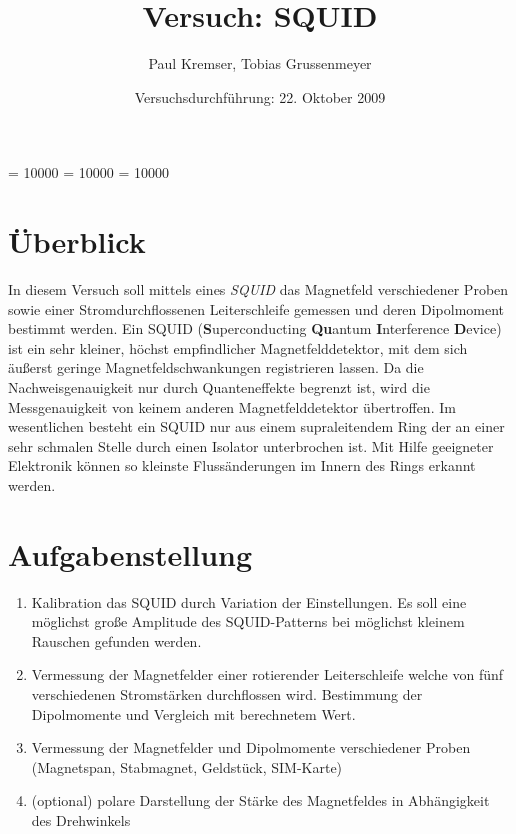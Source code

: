 \documentclass[12pt]{article}
\newcommand{\changefont}[3]{
\fontfamily{#1} \fontseries{#2} \fontshape{#3} \selectfont}
\begin{document}
\clubpenalty = 10000
\widowpenalty = 10000 
\displaywidowpenalty = 10000

\onehalfspacing
\changefont{ptm}{m}{n} 

\begin{titlepage}
\author{Paul Kremser, Tobias Grussenmeyer}
\title{Versuch: SQUID}
\date{Versuchsdurchführung: 22. Oktober 2009} 
\maketitle
\thispagestyle{empty}
\end{titlepage}


\tableofcontents
\thispagestyle{empty}
\newpage
{}
\section{Überblick}
In diesem Versuch soll mittels eines \textit{SQUID} das Magnetfeld verschiedener Proben sowie einer Stromdurchflossenen Leiterschleife gemessen und deren Dipolmoment bestimmt werden. Ein SQUID (\textbf{S}uper\-conducting \textbf{Qu}antum \textbf{I}nterference \textbf{D}evice) ist ein sehr kleiner, höchst empfindlicher Magnetfelddetektor, mit dem sich äußerst geringe Magnetfeldschwankungen registrieren lassen. Da die Nachweisgenauigkeit nur durch Quanteneffekte begrenzt ist, wird die Messgenauigkeit von keinem anderen Magnetfelddetektor übertroffen. Im wesentlichen besteht ein SQUID nur aus einem supraleitendem Ring der an einer sehr schmalen Stelle durch einen Isolator unterbrochen ist. Mit Hilfe geeigneter Elektronik können so kleinste Flussänderungen im Innern des Rings erkannt werden.


\section{Aufgabenstellung}
\begin{enumerate}
 \item Kalibration das SQUID durch Variation der Einstellungen. Es soll eine möglichst große Amplitude des SQUID-Patterns bei möglichst kleinem Rauschen gefunden werden.
\item Vermessung der Magnetfelder einer rotierender Leiterschleife welche von fünf verschiedenen Stromstärken durchflossen wird.  Bestimmung der Dipolmomente und Vergleich mit berechnetem Wert.
\item Vermessung der Magnetfelder und Dipolmomente verschiedener Proben (Magnetspan, Stabmagnet, Geldstück, SIM-Karte)
\item (optional) polare Darstellung der Stärke des Magnetfeldes in Abhängigkeit des Drehwinkels
\end{enumerate}
\newpage
\end{document}
